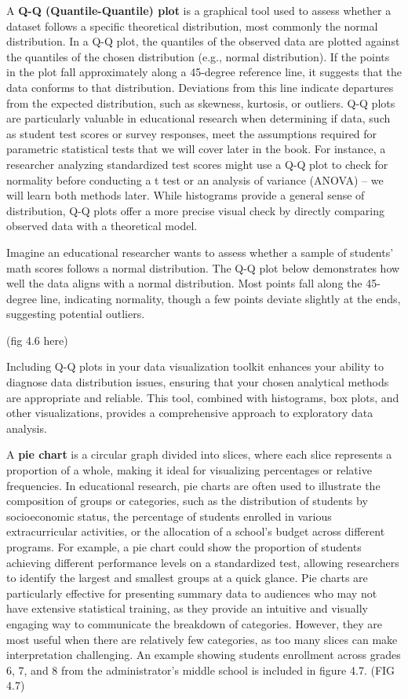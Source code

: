 \documentclass[
  letterpaper,
  DIV=11,
  numbers=noendperiod]{scrreprt}
\begin{document}
A \textbf{Q-Q (Quantile-Quantile) plot} is a graphical tool used to
assess whether a dataset follows a specific theoretical distribution,
most commonly the normal distribution. In a Q-Q plot, the quantiles of
the observed data are plotted against the quantiles of the chosen
distribution (e.g., normal distribution). If the points in the plot fall
approximately along a 45-degree reference line, it suggests that the
data conforms to that distribution. Deviations from this line indicate
departures from the expected distribution, such as skewness, kurtosis,
or outliers. Q-Q plots are particularly valuable in educational research
when determining if data, such as student test scores or survey
responses, meet the assumptions required for parametric statistical
tests that we will cover later in the book. For instance, a researcher
analyzing standardized test scores might use a Q-Q plot to check for
normality before conducting a t test or an analysis of variance (ANOVA)
-- we will learn both methods later. While histograms provide a general
sense of distribution, Q-Q plots offer a more precise visual check by
directly comparing observed data with a theoretical model.

Imagine an educational researcher wants to assess whether a sample of
students' math scores follows a normal distribution. The Q-Q plot below
demonstrates how well the data aligns with a normal distribution. Most
points fall along the 45-degree line, indicating normality, though a few
points deviate slightly at the ends, suggesting potential outliers.

(fig 4.6 here)

Including Q-Q plots in your data visualization toolkit enhances your
ability to diagnose data distribution issues, ensuring that your chosen
analytical methods are appropriate and reliable. This tool, combined
with histograms, box plots, and other visualizations, provides a
comprehensive approach to exploratory data analysis.

A \textbf{pie chart} is a circular graph divided into slices, where each
slice represents a proportion of a whole, making it ideal for
visualizing percentages or relative frequencies. In educational
research, pie charts are often used to illustrate the composition of
groups or categories, such as the distribution of students by
socioeconomic status, the percentage of students enrolled in various
extracurricular activities, or the allocation of a school's budget
across different programs. For example, a pie chart could show the
proportion of students achieving different performance levels on a
standardized test, allowing researchers to identify the largest and
smallest groups at a quick glance. Pie charts are particularly effective
for presenting summary data to audiences who may not have extensive
statistical training, as they provide an intuitive and visually engaging
way to communicate the breakdown of categories. However, they are most
useful when there are relatively few categories, as too many slices can
make interpretation challenging. An example showing students enrollment
across grades 6, 7, and 8 from the administrator's middle school is
included in figure 4.7. (FIG 4.7)
\end{document}
